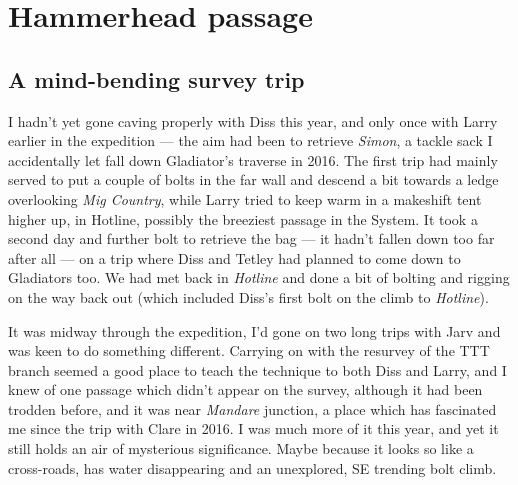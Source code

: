 \section{Hammerhead passage}

\begin{marginfigure}
\end{marginfigure}
\subsection{A mind-bending survey trip}
	I hadn't yet gone caving properly with Diss this year, and only once with Larry earlier in the expedition --- the aim had been to retrieve \emph{Simon}, a tackle sack I accidentally let fall down Gladiator's traverse in 2016. The first trip had mainly served to put a couple of bolts in the far wall and descend a bit towards a ledge overlooking \emph{Mig Country}, while Larry tried to keep warm in a makeshift tent higher up, in Hotline, possibly the breeziest passage in the System. It took a second day and further bolt to retrieve the bag --- it hadn't fallen down too far after all --- on a trip where Diss and Tetley had planned to come down to Gladiators too. We had met back in \emph{Hotline} and done a bit of bolting and rigging on the way back out (which included Diss's first bolt on the climb to \emph{Hotline}).
	
	It was midway through the expedition, I'd gone on two long trips with Jarv and was keen to do something different. Carrying on with the resurvey of the TTT branch seemed a good place to teach the technique to both Diss and Larry, and I knew of one passage which didn't appear on the survey, although it had been trodden before, and it was near \emph{Mandare} junction, a place which has fascinated me since the trip with Clare in 2016. I was much more of it this year, and yet it still holds an air of mysterious significance. Maybe because it looks so like a cross-roads, has water disappearing and an unexplored, SE trending bolt climb. 
	

